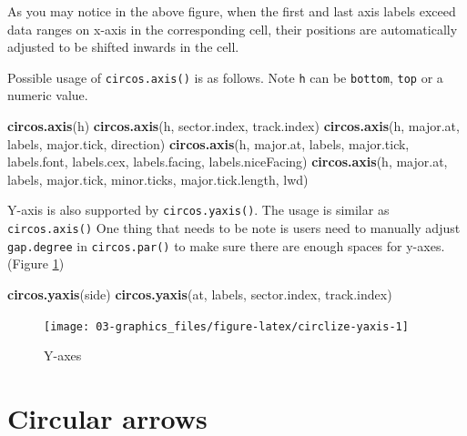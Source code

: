 \documentclass[]{book}
\newenvironment{Shaded}{\begin{snugshade}}{\end{snugshade}}
\newcommand{\KeywordTok}[1]{\textcolor[rgb]{0.13,0.29,0.53}{\textbf{#1}}}
\newcommand{\NormalTok}[1]{#1}
\theoremstyle{definition}
\theoremstyle{definition}
\theoremstyle{remark}
\begin{document}
As you may notice in the above figure, when the first and last axis
labels exceed data ranges on x-axis in the corresponding cell, their
positions are automatically adjusted to be shifted inwards in the cell.

Possible usage of \texttt{circos.axis()} is as follows. Note \texttt{h}
can be \texttt{bottom}, \texttt{top} or a numeric value.

\begin{Shaded}
\begin{Highlighting}[]
\KeywordTok{circos.axis}\NormalTok{(h)}
\KeywordTok{circos.axis}\NormalTok{(h, sector.index, track.index)}
\KeywordTok{circos.axis}\NormalTok{(h, major.at, labels, major.tick, direction)}
\KeywordTok{circos.axis}\NormalTok{(h, major.at, labels, major.tick, labels.font, labels.cex,}
\NormalTok{            labels.facing, labels.niceFacing)}
\KeywordTok{circos.axis}\NormalTok{(h, major.at, labels, major.tick, minor.ticks,}
\NormalTok{            major.tick.length, lwd)}
\end{Highlighting}
\end{Shaded}

Y-axis is also supported by \texttt{circos.yaxis()}. The usage is
similar as \texttt{circos.axis()} One thing that needs to be note is
users need to manually adjust \texttt{gap.degree} in
\texttt{circos.par()} to make sure there are enough spaces for y-axes.
(Figure \ref{fig:circlize-yaxis})

\begin{Shaded}
\begin{Highlighting}[]
\KeywordTok{circos.yaxis}\NormalTok{(side)}
\KeywordTok{circos.yaxis}\NormalTok{(at, labels, sector.index, track.index)}
\end{Highlighting}
\end{Shaded}

\begin{figure}

{\centering \texttt{[image: 03-graphics\_files/figure-latex/circlize-yaxis-1]} 

}

\caption{Y-axes}\label{fig:circlize-yaxis}
\end{figure}

\section{Circular arrows}\label{circular-arrows}
\end{document}
